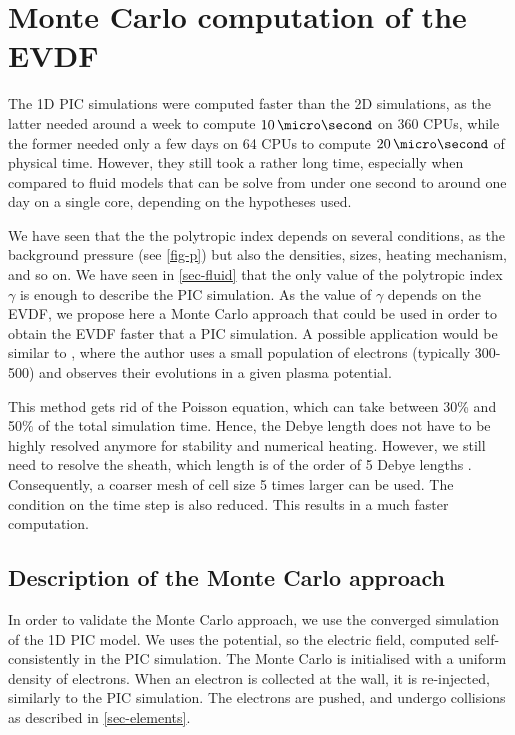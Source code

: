 
\section{Monte Carlo computation of the EVDF}
\label{sec-MCM}
  
  The \ac{1D} \ac{PIC} simulations were computed faster than the \ac{2D} simulations, as the latter needed around a week to compute $10\,\micro\second$ on 360 CPUs, while the former needed only a few days on 64 CPUs to compute $20\,\micro\second$ of physical time.
  However, they still took a rather long time, especially when compared to fluid models that can be solve from under one second to around one day on a single core, depending on the hypotheses used.
  
  We have seen that the the polytropic index depends on several conditions, as the background pressure (see \cref{fig-p}) but also the densities, sizes, heating mechanism, and so on.
  We have seen in \cref{sec-fluid} that the only value of the polytropic index $\gamma$ is enough to describe the \ac{PIC} simulation.
  As the value of $\gamma$ depends on the \ac{EVDF}, we propose here a Monte Carlo approach that could be used in order to obtain the \ac{EVDF} faster that a \ac{PIC} simulation.
  A possible application would be similar to \citet{kushner1983}, where the author uses a small population of electrons (typically 300-500) and observes their evolutions in a given plasma potential.
  
  This method gets rid of the Poisson equation, which can take between 30\% and 50\% of the total simulation time.
  Hence, the Debye length does not have to be highly resolved anymore for stability and numerical heating.
  However, we still need to resolve the sheath, which length is of the order of 5 Debye lengths \citep{chabert2014}.
  Consequently, a coarser mesh of cell size 5 times larger can be used.
  The condition on the time step is also reduced.
  This results in a much faster computation.

  \subsection{Description of the Monte Carlo approach}

    In order to validate the Monte Carlo approach, we use the converged simulation of the \ac{1D} \ac{PIC} model.
    We uses the potential, so the electric field, computed self-consistently in the \ac{PIC} simulation.
    The Monte Carlo is initialised with a uniform density of electrons.
    When an electron is collected at the wall, it is re-injected, similarly to the \ac{PIC} simulation.
    The electrons are pushed, and undergo collisions as described in \cref{sec-elements}.

